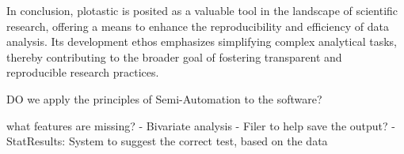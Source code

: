 In conclusion, plotastic is posited as a valuable tool in the landscape of
scientific research, offering a means to enhance the reproducibility and
efficiency of data analysis. Its development ethos emphasizes simplifying
complex analytical tasks, thereby contributing to the broader goal of fostering
transparent and reproducible research practices.


DO we apply the principles of Semi-Automation to the software?

what features are missing?
- Bivariate analysis
- Filer to help save the output?
- StatResults: System to suggest the correct test, based on the data
